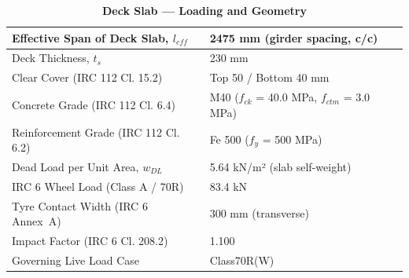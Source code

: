 \documentclass[12pt,a4paper]{report}
\numberwithin{table}{chapter}
\numberwithin{figure}{chapter}
\begin{document}
\vspace{1em}
\begin{longtable}{|L{5.5cm}|p{10.0cm}|}
\caption{\textbf{Deck Slab --- Loading and Geometry}}
\hline
\textnormal{Effective Span of Deck Slab, $l_{eff}$} & 2475 mm (girder spacing, c/c) \\[6pt]
\hline
\textnormal{Deck Thickness, $t_s$} & 230 mm \\[6pt]
\hline
\textnormal{Clear Cover (IRC 112 Cl. 15.2)} & Top 50 / Bottom 40 mm \\[6pt]
\hline
\textnormal{Concrete Grade (IRC 112 Cl. 6.4)} & M40 ($f_{ck}$ = 40.0 MPa, $f_{ctm}$ = 3.0 MPa) \\[6pt]
\hline
\textnormal{Reinforcement Grade (IRC 112 Cl. 6.2)} & Fe 500 ($f_y$ = 500 MPa) \\[6pt]
\hline
\textnormal{Dead Load per Unit Area, $w_{DL}$} & 5.64 kN/m² (slab self-weight) \\[6pt]
\hline
\textnormal{IRC 6 Wheel Load (Class A / 70R)} & 83.4 kN \\[6pt]
\hline
\textnormal{Tyre Contact Width (IRC 6 Annex~A)} & 300 mm (transverse) \\[6pt]
\hline
\textnormal{Impact Factor (IRC 6 Cl. 208.2)} & 1.100 \\[6pt]
\hline
\textnormal{Governing Live Load Case} & Class70R(W) \\[6pt]
\hline
\end{longtable}
\end{document}
